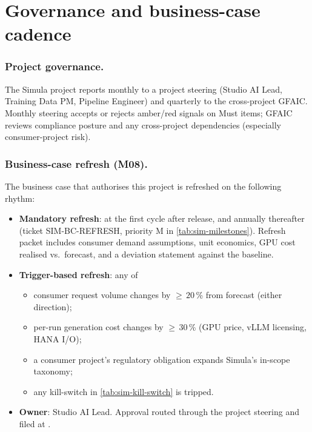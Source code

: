 \section{Governance and business-case cadence}\label{sec:sim-governance}

\subsubsection{Project governance.}
The Simula project reports monthly to a project steering (Studio AI
Lead, Training Data PM, Pipeline Engineer) and quarterly to the
cross-project GFAIC. Monthly steering accepts or rejects amber/red
signals on Must items; GFAIC reviews compliance posture and any
cross-project dependencies (especially consumer-project risk).

\subsubsection{Business-case refresh (M08).}
The business case that authorises this project is refreshed on the
following rhythm:

\begin{itemize}
  \item \textbf{Mandatory refresh}: at the first cycle after release,
        and annually thereafter (ticket SIM-BC-REFRESH, priority M in
        \cref{tab:sim-milestones}). Refresh packet includes consumer
        demand assumptions, unit economics,
        GPU cost realised vs.\ forecast, and a deviation statement
        against the baseline.
  \item \textbf{Trigger-based refresh}: any of
        \begin{itemize}
          \item consumer request volume changes by $\ge\,20$\,\% from
                forecast (either direction);
          \item per-run generation cost changes by $\ge\,30$\,\% (GPU
                price, vLLM licensing, HANA I/O);
          \item a consumer project's regulatory obligation expands
                Simula's in-scope taxonomy;
          \item any kill-switch in \cref{tab:sim-kill-switch} is
                tripped.
        \end{itemize}
  \item \textbf{Owner}: Studio AI Lead. Approval routed through the
        project steering and filed at
        .
\end{itemize}
